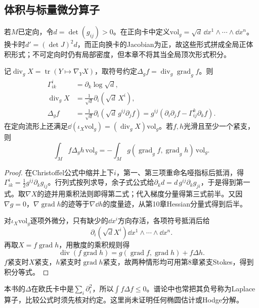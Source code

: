\subsection*{体积与标量微分算子}
若$M$已定向，令$d=\det(g_{ij})>0$。在正向卡中定义$\mathrm{vol}_g=\sqrt d\,\dd x^1\wedge\cdots\wedge\dd x^n$。换卡时$d'=(\det J)^2d$，而正向换卡的Jacobian为正，故这些形式拼成全局正体积形式；不可定向时仍有局部密度，但本章不将其当全局顶次形式积分。

\begin{proposition}[散度与Laplace算子]\label{prop:metric-divergence}
记$\operatorname{div}_gX=\operatorname{tr}(Y\mapsto\nabla_YX)$，取符号约定$\Delta_g f=\operatorname{div}_g\operatorname{grad}_g f$。则
\begin{align*}
 \Gamma^i_{ik}&=\partial_k\log\sqrt d,\\
 \operatorname{div}_gX&=\frac1{\sqrt d}\partial_i(\sqrt d\,X^i),\\
 \Delta_g f&=\frac1{\sqrt d}\partial_i(\sqrt d\,g^{ij}\partial_j f)
 =g^{ij}(\partial_i\partial_j f-\Gamma^k_{ij}\partial_k f).
\end{align*}
在定向流形上还满足$\dd(\iota_X\mathrm{vol}_g)=(\operatorname{div}_gX)\mathrm{vol}_g$。若$f,h$光滑且至少一个紧支，则
\[
 \int_M f\Delta_g h\,\mathrm{vol}_g
 =-\int_M g(\operatorname{grad}_g f,\operatorname{grad}_g h)\,\mathrm{vol}_g.
\]
\end{proposition}
\begin{proof}
在Christoffel公式中缩并上下$i$，第一、第三项重命名哑指标后抵消，得$\Gamma^i_{ik}=\tfrac12g^{ij}\partial_k g_{ij}$。行列式按列求导，余子式公式给$\partial_k d=d\,g^{ij}\partial_k g_{ji}$，于是得到第一式。取$\nabla X$的迹并用乘积法则即得第二式；代入梯度分量得第三式前半。又因$\nabla g=0$，$\nabla\operatorname{grad}h$的迹等于$\nabla\dd h$的度量迹，从第10章Hessian分量式得到后半。

对$\iota_X\mathrm{vol}_g$逐项外微分，只有缺少的$\dd x^i$方向存活，各项符号抵消后给
\[
 \partial_i(\sqrt d X^i)\dd x^1\wedge\cdots\wedge\dd x^n.
\]
再取$X=f\operatorname{grad}h$，用散度的乘积规则得
\[
 \operatorname{div}(f\operatorname{grad}h)
 =g(\operatorname{grad}f,\operatorname{grad}h)+f\Delta h.
\]
$f$紧支时$X$紧支，$h$紧支时$\operatorname{grad}h$紧支，故两种情形均可用第8章紧支Stokes，得到积分等式。
\end{proof}

本书的$\Delta$在欧氏卡中是$\sum_i\partial_i^2$，所以$\int f\Delta f\leq0$。谱论中也常把其负号称为Laplace算子，比较公式时须先核对约定。这里尚未证明任何椭圆估计或Hodge分解。
